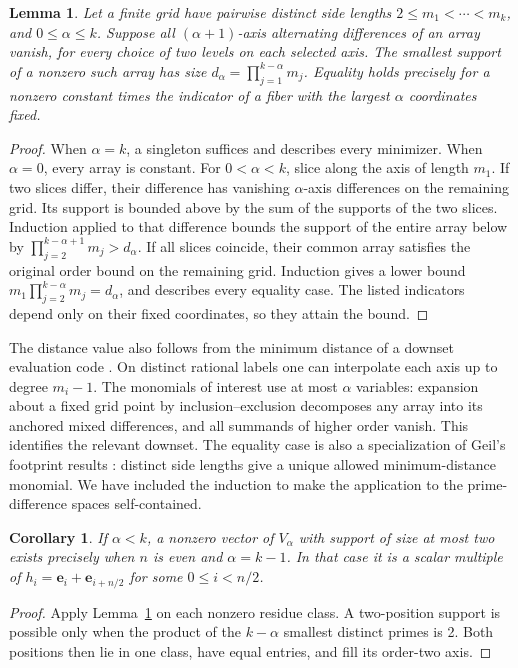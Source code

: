\documentclass[11pt]{article}
\newtheorem{lemma}[theorem]{Lemma}
\newtheorem{corollary}[theorem]{Corollary}
\begin{document}
\begin{lemma}\label{distance}
Let a finite grid have pairwise distinct side lengths
\(2\le m_1<\cdots<m_k\), and \(0\le\alpha\le k\).
Suppose all \((\alpha+1)\)-axis alternating differences of an array
vanish, for every choice of two levels on each selected axis.
The smallest support of a nonzero such array has size
\(d_\alpha=\prod_{j=1}^{k-\alpha}m_j\).
Equality holds precisely for a nonzero constant times the indicator
of a fiber with the largest \(\alpha\) coordinates fixed.
\end{lemma}
\begin{proof}
When \(\alpha=k\), a singleton suffices and describes every minimizer.
When \(\alpha=0\), every array is constant. For \(0<\alpha<k\), slice
along the axis of length \(m_1\).
If two slices differ, their difference has vanishing \(\alpha\)-axis
differences on the remaining grid. Its support is bounded above by
the sum of the supports of the two slices. Induction applied to that
difference bounds the support of the entire array below by
\(\prod_{j=2}^{k-\alpha+1}m_j>d_\alpha\).
If all slices coincide, their common array satisfies the original
order bound on the remaining grid. Induction gives a lower bound
\(m_1\prod_{j=2}^{k-\alpha}m_j=d_\alpha\), and describes every
equality case. The listed indicators depend only on their fixed
coordinates, so they attain the bound.
\end{proof}

The distance value also follows from the minimum distance of a downset
evaluation code \cite[Lemma~2]{downset}. On distinct rational labels
one can interpolate each axis up to degree \(m_i-1\). The monomials of
interest use at most \(\alpha\) variables: expansion about a fixed grid
point by inclusion--exclusion decomposes any array into its anchored
mixed differences, and all summands of higher order vanish. This
identifies the relevant downset. The equality case is also a
specialization of Geil's footprint results \cite[Theorem~7 and
Corollary~9]{geil}: distinct side lengths give a unique allowed
minimum-distance monomial. We have included the induction to make the
application to the prime-difference spaces self-contained.

\begin{corollary}\label{periods}
If \(\alpha<k\), a nonzero vector of \(V_\alpha\) with support of size
at most two exists precisely when \(n\) is even and \(\alpha=k-1\).
In that case it is a scalar multiple of
\(h_i=\mathbf e_i+\mathbf e_{i+n/2}\) for some \(0\le i<n/2\).
\end{corollary}
\begin{proof}
Apply Lemma~\ref{distance} on each nonzero residue class. A
two-position support is possible only when the product of the
\(k-\alpha\) smallest distinct primes is 2. Both positions then lie in
one class, have equal entries, and fill its order-two axis.
\end{proof}
\end{document}
